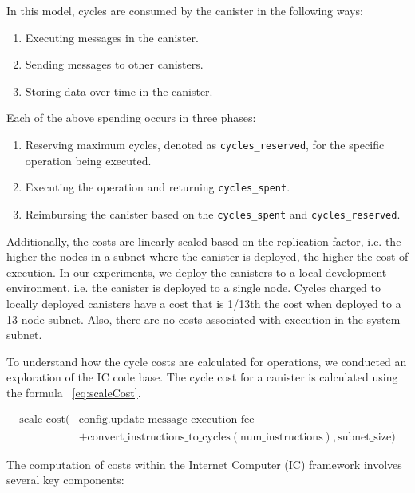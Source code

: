 In this model, cycles are consumed by the canister in the following ways:
\begin{enumerate}
    \item Executing messages in the canister.
    \item Sending messages to other canisters.
    \item Storing data over time in the canister.
\end{enumerate}

Each of the above spending occurs in three phases:
\begin{enumerate}
    \item Reserving maximum cycles, denoted as \texttt{cycles\_reserved}, for the specific operation being executed.
    \item Executing the operation and returning \texttt{cycles\_spent}.
    \item Reimbursing the canister based on the \texttt{cycles\_spent} and \texttt{cycles\_reserved}.
\end{enumerate}

Additionally, the costs are linearly scaled based on the replication factor, i.e. the higher the nodes in a subnet where the canister is deployed, the higher the cost of execution. In our experiments, we deploy the canisters to a local development environment, i.e. the canister is deployed to a single node. Cycles charged to locally deployed canisters have a cost that is 1/13th the cost when deployed to a 13-node subnet. Also, there are no costs associated with execution in the system subnet.

To understand how the cycle costs are calculated for operations, we conducted an exploration of the IC code base. The cycle cost for a canister is calculated using the formula ~\ref{eq:scaleCost}.


\begin{align}
    \text{scale\_cost}(&\text{config.update\_message\_execution\_fee} \nonumber \\
    &+ \text{convert\_instructions\_to\_cycles}(\text{num\_instructions}), \text{subnet\_size})
    \label{eq:scaleCost}
\end{align}


The computation of costs within the Internet Computer (IC) framework involves several key components:

